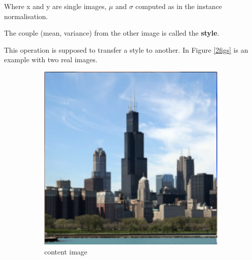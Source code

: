 \documentclass[a4paper]{article}
\begin{document}
\vspace{0.5cm}
Where x and y are single images, $\mu$ and $\sigma$ computed as in the instance normalisation.

The couple (mean, variance) from the other image is called the \textbf{style}.

This operation is supposed to transfer a style to another. In Figure \ref{2figs} is an example with two real images.

\begin{figure}[H]
  \centering
  \begin{subfigure}{.45\textwidth}
    \centering
    \includegraphics[width=\linewidth]{imagesfrompapers/content image.png}
    \caption{content image}
  \end{subfigure}%
  \begin{subfigure}{.45\textwidth}
    \centering

\end{subfigure}
\end{figure}
\end{document}

